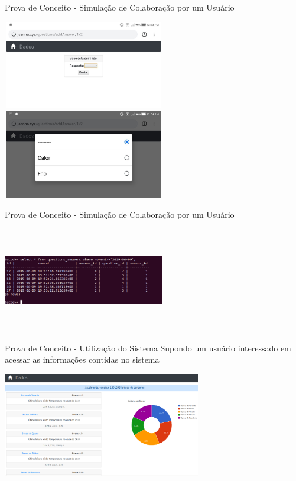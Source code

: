 \documentclass{beamer}
\begin{document}
    \begin{frame}{Prova de Conceito - Simulação de Colaboração por um Usuário}
      \begin{center}
      \includegraphics[height=110pt, width=200pt]{prova6}
      \includegraphics[height=110pt, width=200pt]{prova7}
      \end{center}
    \end{frame}
    \begin{frame}{Prova de Conceito - Simulação de Colaboração por um Usuário}
      \begin{center}
        \includegraphics[height=130pt, width=200pt]{prova12}
      \end{center}
    \end{frame}
    \begin{frame}{Prova de Conceito - Utilização do Sistema}
      Supondo um usuário interessado em acessar as informações contidas no sistema
      \begin{center}
      \includegraphics[height=130pt, width=\textwidth]{prova8}
      \end{center}
    \end{frame}
\end{document}
